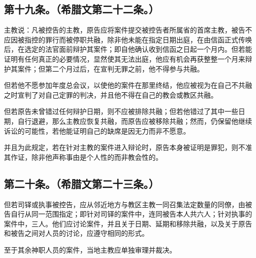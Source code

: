 \subsection{第十九条。（希腊文第二十二条。）}

\par

主教说：凡被控告的主教，原告应将案件提交被控告者所属省的首席主教，被告不应因被指控的罪行而被停职共融，除非他未能在指定日期出庭，在由信函正式传唤后，在选定的法官面前辩护其案件；即自他确认收到信函之日起一个月内。但若能证明有任何真正的必要情况，显然使其无法出庭，他应有机会再获整整一个月来辩护其案件；但第二个月过后，在宣判无罪之前，他不得参与共融。\par

但若他不愿参加年度总会议，以使他的案件在那里终结，他应被视为在自己不共融之时宣判了对自己定罪的判决，并且他不得在自己的教会或教区共融。\par

但若原告未曾错过任何辩护日期，则不应被排除共融；但若他错过了其中一些日期，自行退避，那么主教应恢复共融，而原告应被移除共融；然而，仍保留他继续诉讼的可能性，若他能证明自己的缺席是因无力而非不愿意。\par

并且为此规定，若在针对主教的案件进入辩论时，原告本身被证明是罪犯，则不准其作证，除非他声称事由是个人性的而非教会性的。\par


\subsection{第二十条。（希腊文第二十三条。）}

\par

但若司铎或执事被控告，应从邻近地方与教区主教一同召集法定数量的同僚，由被告自行从同一范围指定；即针对司铎的案件中，连同被告本人共六人；针对执事的案件中，三人。他们应讨论案件，并且关于日期、延期和移除共融，以及关于原告和被告之间对人员的讨论，应遵守相同的形式。\par

至于其余神职人员的案件，当地主教应单独审理并裁决。\par


